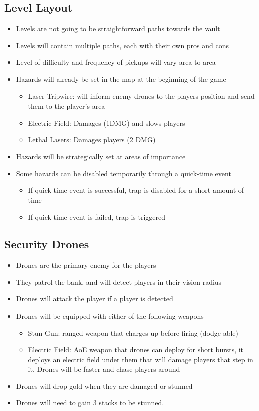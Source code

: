 \documentclass[14pt]{report}
\begin{document}
\subsection{Level Layout}
\begin{itemize}
    \item Levels are not going to be straightforward paths towards the vault
    \item Levels will contain multiple paths, each with their own pros and cons
    \item Level of difficulty and frequency of pickups will vary area to area
    \item Hazards will already be set in the map at the beginning of the game
    \begin{itemize}
        \item Laser Tripwire: will inform enemy drones to the players position and send them to the player's area
        \item Electric Field: Damages (1DMG) and slows players
        \item Lethal Lasers: Damages players (2 DMG)
    \end{itemize}
    \item Hazards will be strategically set at areas of importance
    \item Some hazards can be disabled temporarily through a quick-time event
    \begin{itemize}
        \item If quick-time event is successful, trap is disabled for a short amount of time
        \item If quick-time event is failed, trap is triggered
    \end{itemize}
\end{itemize}

\subsection{Security Drones}
\begin{itemize}
    \item Drones are the primary enemy for the players
    \item They patrol the bank, and will detect players in their vision radius
    \item Drones will attack the player if a player is detected
    \item Drones will be equipped with either of the following weapons
    \begin{itemize}
        \item Stun Gun: ranged weapon that charges up before firing (dodge-able)
        \item Electric Field: AoE weapon that drones can deploy for short bursts, it deploys an electric field under them that will damage players that step in it. Drones will be faster and chase players around
    \end{itemize}
    \item Drones will drop gold when they are damaged or stunned
    \item Drones will need to gain 3 stacks to be stunned.
\end{itemize}
\end{document}
